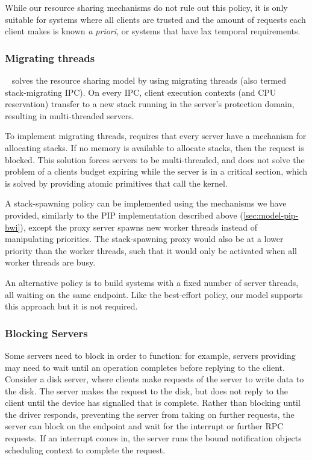 While our resource sharing mechanisms do not rule out this policy, it is only suitable for
systems where all clients are trusted and the amount of requests each client makes is known \emph{a
priori}, or systems that have lax temporal requirements.

\subsubsection{Migrating threads}

\composite~\citep{Parmer_10} solves the resource sharing model by using migrating 
threads (also termed stack-migrating IPC).
On every IPC, client execution contexts (and CPU reservation) transfer to a new stack running in the
server's protection domain, resulting in multi-threaded servers.

To implement migrating threads, \composite requires that every server have a mechanism for allocating stacks.
If no memory is available to allocate stacks, then the request is blocked.
This solution forces servers to be multi-threaded, and does not solve the problem of a clients budget expiring while the server is in a critical section, which is solved by providing atomic primitives that call the kernel.

A stack-spawning policy can be implemented using the mechanisms we have provided, similarly to
the \gls{PIP} implementation described above (\cref{sec:model-pip-bwi}), except the proxy
server spawns new worker threads instead of manipulating priorities. 
The stack-spawning proxy would also be at a lower priority than the worker threads, 
such that it would only be activated when all worker threads are busy.

An alternative policy is to build systems with a fixed number of server threads, all waiting on the
same endpoint. 
Like the best-effort policy, our model supports this approach but it is not required.

\subsubsection{Blocking Servers}

Some servers need to block in order to function: for example, servers providing \IO may need to wait
until an operation completes before replying to the client. Consider a disk server, where
clients make requests of the server to write data to the disk. The server makes the request to the
disk, but does not reply to the client until the device has signalled that \IO is complete. Rather
than blocking until the driver responds, preventing the server from taking on further requests, the
server can block on the endpoint and wait for the interrupt or further RPC requests. If an interrupt
comes in, the server runs the bound notification objects scheduling context to complete the
request.

